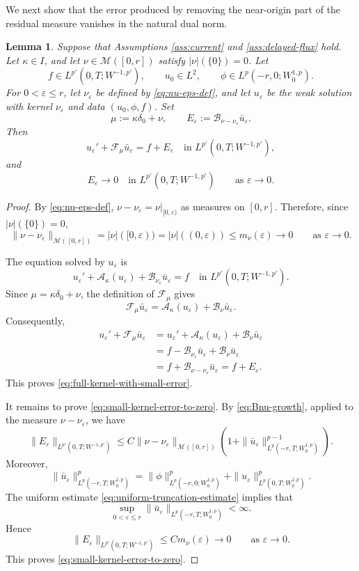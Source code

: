 \documentclass[a4paper,11pt,oneside,reqno]{amsart}
\newtheorem{lemma}[theorem]{Lemma}
\newcounter{c}
\newcounter{d}
\newcounter{b}
\newcommand{\e}{\varepsilon}
\newcommand{\M}{\mathcal{M}}
\begin{document}
We next show that the error produced by removing the near-origin part of the
residual measure vanishes in the natural dual norm.

\begin{lemma}\label{lem:small-kernel-error}
Suppose that Assumptions \ref{ass:current} and \ref{ass:delayed-flux} hold.
Let \(\kappa\in I\), and let \(\nu\in\M([0,r])\) satisfy
\(|\nu|(\{0\})=0\). Let
\[
 f\in L^{p'}(0,T;W^{-1,p'}),\qquad
 u_0\in L^2,\qquad
 \phi\in L^p(-r,0;W^{1,p}_0).
\]
For \(0<\e\le r\), let \(\nu_\e\) be defined by
\eqref{eq:nu-eps-def}, and let \(u_\e\) be the weak solution with kernel
\(\nu_\e\) and data \((u_0,\phi,f)\). Set
\[
 \mu:=\kappa\delta_0+\nu,
 \qquad
 E_\e:=\mathcal B_{\nu-\nu_\e}\bar u_\e .
\]
Then
\begin{equation}
 u_\e'
 +\mathcal F_\mu\bar u_\e
 =
 f+E_\e
 \quad\text{in }L^{p'}(0,T;W^{-1,p'}),
 \label{eq:full-kernel-with-small-error}
\end{equation}
and
\begin{equation}
 E_\e\to0
 \quad\text{in }L^{p'}(0,T;W^{-1,p'})
 \qquad\text{as }\e\to0 .
 \label{eq:small-kernel-error-to-zero}
\end{equation}
\end{lemma}

\begin{proof}
By \eqref{eq:nu-eps-def}, \(\nu-\nu_\e=\nu|_{[0,\e)}\)
as measures on \([0,r]\). Therefore, since \(|\nu|(\{0\})=0\),
\[
 \|\nu-\nu_\e\|_{\M([0,r])}
 =
 |\nu|([0,\e))
 =
 |\nu|((0,\e))
 \le
 m_\nu(\e)
 \to0
 \qquad\text{as }\e\to0 .
\]

The equation solved by \(u_\e\) is
\[
 u_\e'
 +\mathcal A_\kappa(u_\e)
 +\mathcal B_{\nu_\e}\bar u_\e
 =
 f
 \quad\text{in }L^{p'}(0,T;W^{-1,p'}).
\]
Since \(\mu=\kappa\delta_0+\nu\), the definition of
\(\mathcal F_\mu\) gives
\[
 \mathcal F_\mu\bar u_\e
 =
 \mathcal A_\kappa(u_\e)
 +
 \mathcal B_\nu\bar u_\e .
\]
Consequently,
\[
\begin{aligned}
 u_\e'
 +\mathcal F_\mu\bar u_\e
 &=
 u_\e'
 +\mathcal A_\kappa(u_\e)
 +\mathcal B_\nu\bar u_\e  \\
 &=
 f
 -\mathcal B_{\nu_\e}\bar u_\e
 +\mathcal B_\nu\bar u_\e  \\
 &=
 f
 +\mathcal B_{\nu-\nu_\e}\bar u_\e
 =
 f+E_\e .
\end{aligned}
\]
This proves \eqref{eq:full-kernel-with-small-error}.

It remains to prove \eqref{eq:small-kernel-error-to-zero}. By
\eqref{eq:Bnu-growth}, applied to the measure \(\nu-\nu_\e\), we have
\[
 \|E_\e\|_{L^{p'}(0,T;W^{-1,p'})}
 \le
 C\|\nu-\nu_\e\|_{\M([0,r])}
 \left(
  1+
  \|\bar u_\e\|_{L^p(-r,T;W^{1,p}_0)}^{p-1}
 \right).
\]
Moreover,
\[
 \|\bar u_\e\|_{L^p(-r,T;W^{1,p}_0)}^p
 =
 \|\phi\|_{L^p(-r,0;W^{1,p}_0)}^p
 +
 \|u_\e\|_{L^p(0,T;W^{1,p}_0)}^p .
\]
The uniform estimate \eqref{eq:uniform-truncation-estimate} implies that
\[
 \sup_{0<\e\le r}
 \|\bar u_\e\|_{L^p(-r,T;W^{1,p}_0)}
 <\infty .
\]
Hence
\[
 \|E_\e\|_{L^{p'}(0,T;W^{-1,p'})}
 \le
 C m_\nu(\e)
 \to0
 \qquad\text{as }\e\to0 .
\]
This proves \eqref{eq:small-kernel-error-to-zero}. 
\end{proof}
\end{document}
